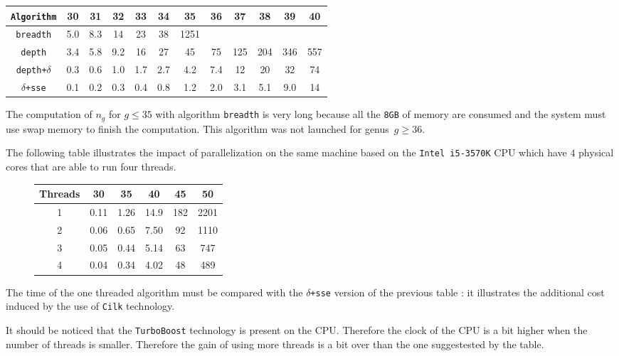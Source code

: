 \documentclass[reqno]{amsart}
\theoremstyle{plain}
\theoremstyle{definition}
\newcommand{\Cilk}{\texttt{Cilk}\xspace}
\renewcommand{\leq}{\leqslant}
\renewcommand{\geq}{\geqslant}
\renewcommand{\tt}[1]{\texttt{#1}}
\begin{document}
\begin{center}
\begin{tabular}{|c|c|c|c|c|c|c|c|c|c|c|c|}
\hline
\texttt{Algorithm}					&  30 &  31 &  32 &  33 &  34 &   35 &  36 &  37 &  38 &  39 &  40 \\
\hline
\texttt{breadth}		& 5.0 & 8.3 &  14 &  23 &  38 & 1251 &     &     &     &     &     \\
\texttt{depth}			& 3.4 & 5.8 & 9.2 &  16 &  27 &   45 &  75 & 125 & 204 & 346 & 557 \\
\texttt{depth+$\delta$}	& 0.3 & 0.6 & 1.0 & 1.7 & 2.7 &  4.2 & 7.4 &  12 &  20 &  32 & 74  \\
\texttt{$\delta$+sse}	& 0.1 & 0.2 & 0.3 & 0.4 & 0.8 &  1.2 & 2.0 & 3.1 & 5.1 & 9.0 & 14 \\
\hline
\end{tabular}
\end{center}

\vspace{1em}

The computation of $n_g$ for $g\leq 35$ with algorithm \texttt{breadth} is very 
long because all the \texttt{8GB} of memory are consumed and the system 
must use swap memory to finish the computation. This algorithm was not launched 
for genus~$g\geq 36$.


The following table illustrates the impact of parallelization on the same 
machine based on the \tt{Intel\texttrademark{} i5-3570K} CPU which have $4$ physical cores that are able to run four threads.
  
  \begin{figure}[h!]
\begin{tabular}{|c|c|c|c|c|c|} 
\hline
Threads & 30 & 35 & 40 & 45 & 50 \\
\hline
1 &  0.11 & 1.26 & 14.9 & 182 & 2201 \\ 
2 &  0.06 & 0.65 & 7.50 &  92 & 1110\\
3 &  0.05 & 0.44 & 5.14 &  63 & 747 \\
4 &  0.04 & 0.34 & 4.02 &  48 & 489 \\
\hline
\end{tabular}
\end{figure}

The time of the one threaded algorithm  must be compared with the 
\texttt{$\delta$+sse} version of the previous table : it illustrates the 
additional cost induced by the use of \Cilk technology. 

It should be noticed that the \texttt{TurboBoost} technology \cite{WikipediaTB} 
is present on the CPU. Therefore the clock of the CPU is a bit higher when the 
number of threads 
is smaller. Therefore the gain of using more threads is a bit over than the one 
suggestested by the table.
\end{document}
